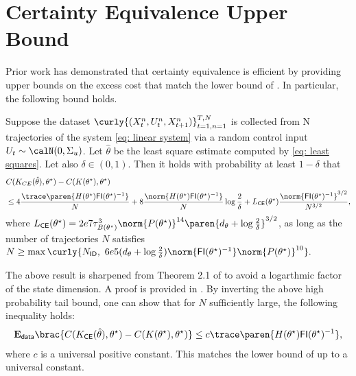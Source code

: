 \section{Certainty Equivalence Upper Bound}
\label{s: certainty equivalence bound}
Prior work \citep{wagenmaker2021task} has demonstrated that certainty equivalence is efficient by providing upper bounds on the excess cost that match the lower bound of . In particular, the following bound holds.
\begin{theorem}
    \label{thm: certainty equivalence bound}
    Suppose the dataset $\curly{(X_t^n, U_t^n, X_{t+1}^n)}_{t=1, n=1}^{T,N}$ is collected from N trajectories of the system \eqref{eq: linear system} via a random control input $U_t \sim \calN(0, \Sigma_u)$. Let $\hat\theta$ be the least square estimate computed by \eqref{eq: least squares}. Let also $\delta\in(0,1)$. Then it holds with probability at least $1-\delta$ that 
    \begin{align}
        &C(K_{CE}(\hat\theta), \theta^\star) - C(K(\theta^\star), \theta^\star) \nonumber\\
        &\leq 4\frac{\trace\paren{H(\theta^\star)\mathsf{FI}(\theta^\star)^{-1}}}{N} + 8\frac{\norm{H(\theta^\star)\mathsf{FI}(\theta^\star)^{-1}}}{N}\log\frac{2}{\delta} + L_{\mathsf{CE}}(\theta^\star)\frac{\norm{\mathsf{FI}(\theta^\star)^{-1}}^{3/2}}{N^{3/2}}, \label{eq:CE Upper bound}
    \end{align}
    where $L_{\mathsf{CE}}(\theta^\star) = 2e7\tau_{B(\theta^\star)}^3\norm{P(\theta^\star)}^{14}\paren{d_\theta+\log\frac{2}{\delta}}^{3/2}$, as long as the number of trajectories $N$ satisfies
     $   N \geq \max\curly{N_{\mathsf{ID}}, ~ 6e5(d_\theta+\log\frac{2}{\delta})\norm{\mathsf{FI}(\theta^\star)^{-1}}\norm{P(\theta^\star)}^{10}}.$%
\end{theorem}
The above result is sharpened from Theorem 2.1 of \citet{wagenmaker2021task} to avoid a logarthmic factor of the state dimension. A proof is provided in . By inverting the above high probability tail bound, one can show that for $N$ sufficiently large, the following inequality holds:
\begin{align*}
    \mathbf{E}_{\mathsf{data}} \brac{C(K_{\mathsf{CE}}(\hat\theta), \theta^\star) - C(K(\theta^\star), \theta^\star)} \leq c \trace\paren{H(\theta^\star) \mathsf{FI}(\theta^\star)^{-1}},
\end{align*}
where $c$ is a universal positive constant. This matches the lower bound of  up to a universal constant. 


